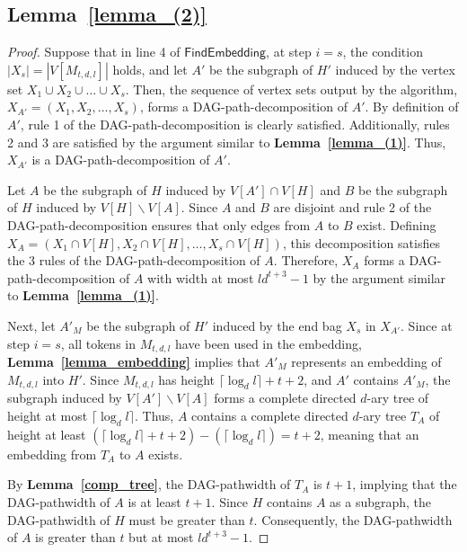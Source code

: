 \documentclass[runningheads]{llncs}
\theoremstyle{plain}
\theoremstyle{definition}
\begin{document}
\subsection{\textbf{Lemma~\ref{lemma_(2)}}}
\begin{proof}
    Suppose that in line 4 of $\mathsf{FindEmbedding}$, at step $i=s$, the condition $|X_s| = |V[M_{t, d, l}]|$ holds, and let $A'$ be the subgraph of $H'$ induced by the vertex set $X_1 \cup X_2 \cup \dots \cup X_s$. Then, the sequence of vertex sets output by the algorithm, $X_{A'} = (X_1, X_2, \dots , X_s)$, forms a DAG-path-decomposition of $A'$. By definition of $A'$, rule 1 of the DAG-path-decomposition is clearly satisfied. Additionally, rules 2 and 3 are satisfied by the argument similar to \textbf{Lemma~\ref{lemma_(1)}}. Thus, $X_{A'}$ is a DAG-path-decomposition of $A'$.

    Let $A$ be the subgraph of $H$ induced by $V[A'] \cap V[H]$ and $B$ be the subgraph of $H$ induced by $V[H] \backslash V[A]$. Since $A$ and $B$ are disjoint and rule 2 of the DAG-path-decomposition ensures that only edges from $A$ to $B$ exist. Defining $X_A = (X_1 \cap V[H], X_2 \cap V[H], \dots , X_s \cap V[H])$, this decomposition satisfies the 3 rules of the DAG-path-decomposition of $A$. Therefore, $X_A$ forms a DAG-path-decomposition of $A$ with width at most $ld^{t+3}-1$ by the argument similar to \textbf{Lemma~\ref{lemma_(1)}}.

    Next, let $A'_M$ be the subgraph of $H'$ induced by the end bag $X_s$ in $X_{A'}$. Since at step $i=s$, all tokens in $M_{t, d, l}$ have been used in the embedding, \textbf{Lemma~\ref{lemma_embedding}} implies that $A'_M$ represents an embedding of $M_{t, d, l}$ into $H'$. Since $M_{t, d, l}$ has height $\lceil \log_d l \rceil +t+2$, and $A'$ contains $A'_M$, the subgraph induced by $V[A'] \backslash V[A]$ forms a complete directed $d$-ary tree of height at most $\lceil \log_d l \rceil$. Thus, $A$ contains a complete directed $d$-ary tree $T_A$ of height at least $(\lceil \log_d l \rceil +t+2) - (\lceil \log_d l \rceil) = t+2$, meaning that an embedding from $T_A$ to $A$ exists. 

    By \textbf{Lemma~\ref{comp_tree}}, the DAG-pathwidth of $T_A$ is $t+1$, implying that the DAG-pathwidth of $A$ is at least $t+1$. Since $H$ contains $A$ as a subgraph, the DAG-pathwidth of $H$ must be greater than $t$. Consequently, the DAG-pathwidth of $A$ is greater than $t$ but at most $ld^{t+3}-1$.
\end{proof}
\end{document}
